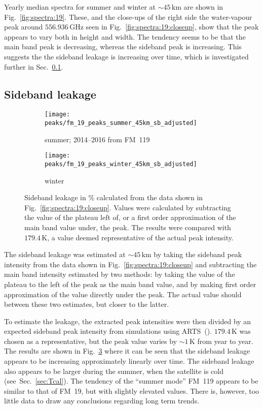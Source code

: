 \noindent
Yearly median spectra for summer and winter at $\sim45\,\mathrm{km}$ are shown
in Fig.~\ref{fig:spectra:19}.  These, and the close-ups of the right side the
water-vapour peak around $556.936\,\mathrm{GHz}$ seen in
Fig.~\ref{fig:spectra:19:closeup}, show that the peak appears to vary both in
height and width.  The tendency seems to be that the main band peak is
decreasing, whereas the sideband peak is increasing.  This suggests the the
sideband leakage is increasing over time, which is investigated further in
Sec.~\ref{FM19:sbl}.


\subsection{Sideband leakage}
\label{FM19:sbl}

\begin{figure}[ht]
    \centering
    \begin{subfigure}[b]{0.9545\textwidth}
        \texttt{[image: peaks/fm\_19\_peaks\_summer\_45km\_sb\_adjusted]}
        \caption{summer; 2014--2016 from FM~119
            }\label{fig:sbl:19:summer}
    \end{subfigure}
    \begin{subfigure}[b]{0.9545\textwidth}
        \texttt{[image: peaks/fm\_19\_peaks\_winter\_45km\_sb\_adjusted]}
        \caption{winter}\label{fig:sbl:19:winter}
    \end{subfigure}
    \caption{Sideband leakage in \% calculated from the data shown in
        Fig.~\ref{fig:spectra:19:closeup}.  Values were calculated by
        subtracting the value of the plateau left of, or a first order
        approximation of the main band value under, the peak.  The results were
        compared with $179.4\,\mathrm{K}$, a value deemed representative of the
        actual peak intensity.
        }\label{fig:sbl:19}
\end{figure}

\noindent
The sideband leakage was estimated at $\sim45\,\mathrm{km}$ by taking the
sideband peak intensity from the data shown in
Fig.~\ref{fig:spectra:19:closeup} and subtracting the main band intensity
estimated by two methods:  by taking the value of the plateau to the left of
the peak as the main band value, and by making first order approximation of the
value directly under the peak.  The actual value should between these two
estimates, but closer to the latter.

To estimate the leakage, the extracted peak intensities were then divided by an
expected sideband peak intensity from simulations using
ARTS~(\cite{buehler:artst:05}).  $179.4\,\mathrm{K}$ was chosen as a
representative, but the peak value varies by $\sim1\,\mathrm{K}$ from year to
year.  The results are shown in Fig.~\ref{fig:sbl:19} where it can be seen that
the sideband leakage appears to be increasing approximately linearly over time.
The sideband leakage also appears to be larger during the summer, when the
satellite is cold (see~Sec.~\ref{sec:Tcal}).  The tendency of the ``summer
mode'' FM~119 appears to be similar to that of FM~19, but with slightly
elevated values.  There is, however, too little data to draw any conclusions
regarding long term trends.


